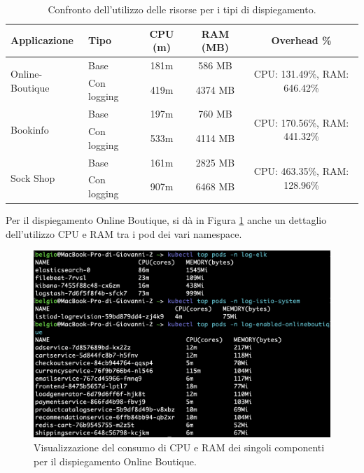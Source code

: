 \begin{table}[h]
\centering
\begin{tabular}{|l|l|c|c|c|}
\hline
\rowcolor{lightgray}
\textbf{Applicazione} & \textbf{Tipo} & \textbf{CPU (m)} & \textbf{RAM (MB)} & \textbf{Overhead \%} \\
\hline
\multirow{2}{*}{Online-Boutique} & Base & 181m & 586 MB & \multirow{2}{*}{CPU: 131.49\%, RAM: 646.42\%} \\
& Con logging & 419m & 4374 MB & \\
\hline
\multirow{2}{*}{Bookinfo} & Base & 197m & 760 MB & \multirow{2}{*}{CPU: 170.56\%, RAM: 441.32\%} \\
& Con logging & 533m & 4114 MB & \\
\hline
\multirow{2}{*}{Sock Shop} & Base & 161m & 2825 MB & \multirow{2}{*}{CPU: 463.35\%, RAM: 128.96\%} \\
& Con logging & 907m & 6468 MB & \\
\hline
\end{tabular}
\caption{Confronto dell'utilizzo delle risorse per i tipi di dispiegamento.}
\label{table:cpu_analysis}
\end{table}

Per il dispiegamento Online Boutique, si dà in Figura \ref{fig:perf_analysis} anche un dettaglio dell'utilizzo CPU e RAM tra i pod dei vari namespace.

\begin{figure}[h]
    \centering
    \includegraphics[width=\textwidth]{immagini/capitolo5/cpu_onlineboutique.png}
    \caption{Visualizzazione del consumo di CPU e RAM dei singoli componenti per il dispiegamento Online Boutique.}
    \label{fig:perf_analysis}
\end{figure}

